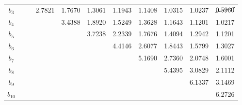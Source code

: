 \begin{table}[h!]
{\begin{tabular}{c|cccccccccc}
		$b_3$  &        &        & 2.7821 & 1.7670 & 1.3061 & 1.1943 & 1.1408 & 1.0315 & 1.0237 & $\cancel{0.5960}$ \\
		$b_4$  &        &        &        & 3.4388 & 1.8920 & 1.5249 & 1.3628 & 1.1643 & 1.1201 & 1.0217 \\
		$b_5$  &        &        &        &        & 3.7238 & 2.2339 & 1.7676 & 1.4094 & 1.2942 & 1.1201 \\
		$b_6$  &        &        &        &        &        & 4.4146 & 2.6077 & 1.8443 & 1.5799 & 1.3027 \\
		$b_7$  &        &        &        &        &        &        & 5.1690 & 2.7360 & 2.0748 & 1.6001 \\
		$b_8$  &        &        &        &        &        &        &        & 5.4395 & 3.0829 & 2.1112 \\
		$b_9$  &        &        &        &        &        &        &        &        & 6.1337 & 3.1469 \\
		$b_{10}$ &        &        &        &        &        &        &        &        &        & 6.2726 \\ \bottomrule[2pt]
	\end{tabular}
}
\end{table}

